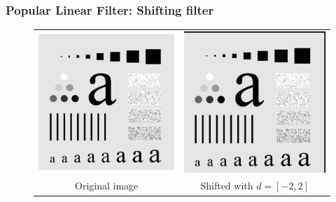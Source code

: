 \documentclass[english,11pt,table,handout]{beamer}
\begin{document}
\frame
{
	\frametitle{Popular Linear Filter: Shifting filter}
	\begin{figure}
		\begin{tabular}{cc}
			\includegraphics[scale=0.53]{char.png} &
			\includegraphics[scale=0.53]{char_shifted_2_2.png} \\
			Original image & Shifted with $d=[-2, 2]$ 
		\end{tabular}
	\end{figure}
}
\end{document}
